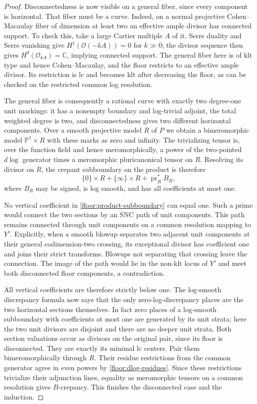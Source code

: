 \documentclass[11pt,letterpaper]{article}
\newcommand{\C}{\mathbb{C}}
\newcommand{\PP}{\mathbb{P}}
\newcommand{\OO}{\mathcal{O}}
\theoremstyle{definition}
\theoremstyle{remark}
\begin{document}
\begin{proof}
Disconnectedness is now visible on a general fiber, since
every component is horizontal.  That fiber must be a
curve.  Indeed, on a normal projective Cohen--Macaulay
fiber of dimension at least two an effective ample
divisor has connected support.  To check this, take a
large Cartier multiple $A$ of it.  Serre duality and
Serre vanishing give $H^1(\OO(-kA))=0$ for $k\gg0$;
the divisor sequence then gives
$H^0(\OO_{kA})=\C$, implying connected support.
The general fiber here is of klt type and hence
Cohen--Macaulay, and the floor restricts to an effective
ample divisor.  Its restriction is lc and becomes klt
after decreasing the floor, as can be checked on the
restricted common log resolution.

The general fiber is consequently a rational curve with
exactly two degree-one unit markings: it has a nonempty
boundary and log-trivial adjoint, the total weighted
degree is two, and disconnectedness gives two different
horizontal components.  Over a smooth projective model
$R$ of $P$ we obtain a bimeromorphic model
$\PP^1\times R$ with these marks as zero and infinity.
The trivializing tensor is, over the function field and
hence meromorphically, a power of the two-pointed
$d\log$ generator times a meromorphic pluricanonical
tensor on $R$.  Resolving its divisor on $R$, the
crepant subboundary on the product is therefore
\begin{equation}
 \label{floor:product-subboundary}
 \{0\}\times R+\{\infty\}\times R
       +\operatorname{pr}_R^*B_R,
\end{equation}
where $B_R$ may be signed, is log smooth, and has all
coefficients at most one.

No vertical coefficient in
\eqref{floor:product-subboundary} can equal one.  Such
a prime would connect the two sections by an SNC path
of unit components.  This path remains connected
through unit components on a common resolution mapping
to $Y'$.  Explicitly, when a smooth blowup separates
two adjacent unit components at their general
codimension-two crossing, its exceptional divisor has
coefficient one and joins their strict transforms.
Blowups not separating that crossing leave the
connection.  The image of the path would lie in the
non-klt locus of $Y'$ and meet both disconnected floor
components, a contradiction.

All vertical coefficients are therefore strictly below
one.  The log-smooth discrepancy formula now says that
the only zero-log-discrepancy places are the two
horizontal sections themselves.  In fact zero places
of a log-smooth subboundary with coefficients at most
one are generated by its unit strata; here the two
unit divisors are disjoint and there are no deeper
unit strata.  Both section valuations occur as
divisors on the original pair, since its floor is
disconnected.  They are exactly its minimal lc
centers.  Pair them bimeromorphically through $R$.
Their residue restrictions from the common generator
agree in even powers by \eqref{floor:dlog-residues}.
Since these restrictions trivialize their adjunction
lines, equality as meromorphic tensors on a common
resolution gives $B$-crepancy.  This finishes the
disconnected case and the induction.
\end{proof}
\end{document}
